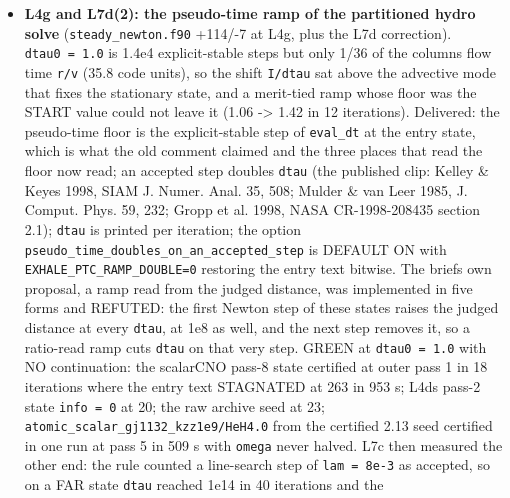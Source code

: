 \documentclass[english,a4paper]{my_memo}
\begin{document}
\begin{itemize}
  non-monotone accepts. On a 45 R\_p domain the row does not vanish but
  becomes everything (pass 1 stalls at 4.8e-2, worst row at cell 500 in 306
  of 343 iterations; not like-for-like, the seed being extrapolated and the
  grid coarser). No anchored rule was written for the last cell: the
  arithmetic resolves it, and a new tolerance there would be a number chosen
  to pass a snapshot. Reported beside the item: \texttt{make\_models.py} gave
  \texttt{scalarCNO} and \texttt{photochem} a \texttt{Resid\ tol} 12.5x stricter than \texttt{scalar} with
  no recorded basis.
\item
  \textbf{L4g and L7d(2): the pseudo-time ramp of the partitioned hydro solve}
  (\texttt{steady\_newton.f90} +114/-7 at L4g, plus the L7d correction). \texttt{dtau0\ =\ 1.0}
  is 1.4e4 explicit-stable steps but only 1/36 of the column\textquotesingle s flow time
  \texttt{r/v} (35.8 code units), so the shift \texttt{I/dtau} sat above the advective mode
  that fixes the stationary state, and a merit-tied ramp whose floor was the
  START value could not leave it (1.06 -\textgreater{} 1.42 in 12 iterations). Delivered:
  the pseudo-time floor is the explicit-stable step of \texttt{eval\_dt} at the entry
  state, which is what the old comment claimed and the three places that read
  the floor now read; an accepted step doubles \texttt{dtau} (the published clip:
  Kelley \& Keyes 1998, SIAM J. Numer. Anal. 35, 508; Mulder \& van Leer 1985,
  J. Comput. Phys. 59, 232; Gropp et al. 1998, NASA CR-1998-208435 section
  2.1); \texttt{dtau} is printed per iteration; the option
  \texttt{pseudo\_time\_doubles\_on\_an\_accepted\_step} is DEFAULT ON with
  \texttt{EXHALE\_PTC\_RAMP\_DOUBLE=0} restoring the entry text bitwise. The brief\textquotesingle s
  own proposal, a ramp read from the judged distance, was implemented in five
  forms and REFUTED: the first Newton step of these states raises the judged
  distance at every \texttt{dtau}, at 1e8 as well, and the next step removes it, so
  a ratio-read ramp cuts \texttt{dtau} on that very step. GREEN at \texttt{dtau0\ =\ 1.0}
  with NO continuation: the scalarCNO pass-8 state certified at outer pass 1
  in 18 iterations where the entry text STAGNATED at 263 in 953 s; L4d\textquotesingle s
  pass-2 state \texttt{info\ =\ 0} at 20; the raw archive seed at 23;
  \texttt{atomic\_scalar\_gj1132\_kzz1e9/HeH4.0} from the certified 2.13 seed certified
  in one run at pass 5 in 509 s with \texttt{omega} never halved. L7c then measured
  the other end: the rule counted a line-search step of \texttt{lam\ =\ 8e-3} as
  accepted, so on a FAR state \texttt{dtau} reached 1e14 in 40 iterations and the

\end{itemize}
\end{document}
